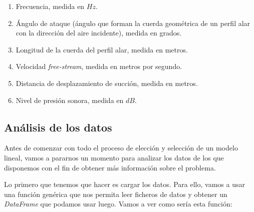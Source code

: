 \documentclass[11pt,a4paper]{article}
\begin{document}
\begin{enumerate}
	\item Frecuencia, medida en $Hz$.
	\item Ángulo de ataque (ángulo que forman la cuerda geométrica de un perfil alar con la dirección del aire incidente),
		  medida en grados.
	\item Longitud de la cuerda del perfil alar, medida en metros.
	\item Velocidad \textit{free-stream}, medida en metros por segundo. 
	\item Distancia de desplazamiento de succión, medida en metros.
	\item Nivel de presión sonora, medida en $dB$.
\end{enumerate}

 \subsection{Análisis de los datos}\label{anuxe1lisis-de-los-datos}

    Antes de comenzar con todo el proceso de elección y selección de un
modelo lineal, vamos a pararnos un momento para analizar los datos de
los que disponemos con el fin de obtener más información sobre el
problema.

Lo primero que tenemos que hacer es cargar los datos. Para ello, vamos a
usar una función genérica que nos permita leer ficheros de datos y
obtener un \emph{DataFrame} que podamos usar luego. Vamos a ver como
sería esta función:
\end{document}
